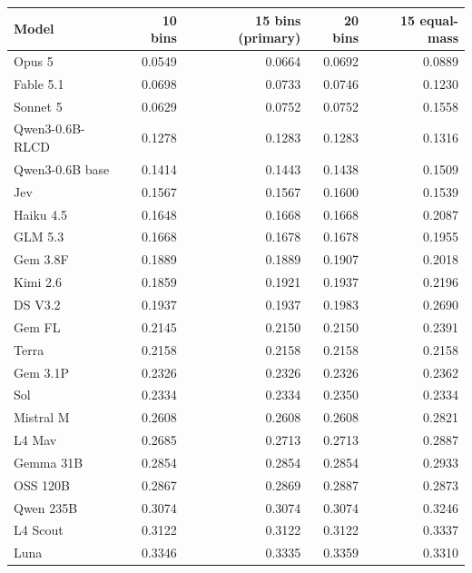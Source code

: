 \begin{tabular}{lrrrr}
\toprule
Model & 10 bins & 15 bins (primary) & 20 bins & 15 equal-mass \\
\midrule
Opus 5 & 0.0549 & 0.0664 & 0.0692 & 0.0889 \\
Fable 5.1 & 0.0698 & 0.0733 & 0.0746 & 0.1230 \\
Sonnet 5 & 0.0629 & 0.0752 & 0.0752 & 0.1558 \\
Qwen3-0.6B-RLCD & 0.1278 & 0.1283 & 0.1283 & 0.1316 \\
Qwen3-0.6B base & 0.1414 & 0.1443 & 0.1438 & 0.1509 \\
Jev & 0.1567 & 0.1567 & 0.1600 & 0.1539 \\
Haiku 4.5 & 0.1648 & 0.1668 & 0.1668 & 0.2087 \\
GLM 5.3 & 0.1668 & 0.1678 & 0.1678 & 0.1955 \\
Gem 3.8F & 0.1889 & 0.1889 & 0.1907 & 0.2018 \\
Kimi 2.6 & 0.1859 & 0.1921 & 0.1937 & 0.2196 \\
DS V3.2 & 0.1937 & 0.1937 & 0.1983 & 0.2690 \\
Gem FL & 0.2145 & 0.2150 & 0.2150 & 0.2391 \\
Terra & 0.2158 & 0.2158 & 0.2158 & 0.2158 \\
Gem 3.1P & 0.2326 & 0.2326 & 0.2326 & 0.2362 \\
Sol & 0.2334 & 0.2334 & 0.2350 & 0.2334 \\
Mistral M & 0.2608 & 0.2608 & 0.2608 & 0.2821 \\
L4 Mav & 0.2685 & 0.2713 & 0.2713 & 0.2887 \\
Gemma 31B & 0.2854 & 0.2854 & 0.2854 & 0.2933 \\
OSS 120B & 0.2867 & 0.2869 & 0.2887 & 0.2873 \\
Qwen 235B & 0.3074 & 0.3074 & 0.3074 & 0.3246 \\
L4 Scout & 0.3122 & 0.3122 & 0.3122 & 0.3337 \\
Luna & 0.3346 & 0.3335 & 0.3359 & 0.3310 \\
\bottomrule
\end{tabular}

